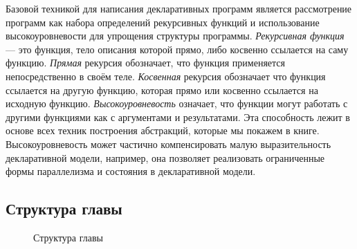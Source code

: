 Базовой техникой для написания декларативных программ является рассмотрение программ как набора определений рекурсивных функций и использование высокоуровневости для упрощения структуры программы. \emph{Рекурсивная функция} --- это функция, тело описания которой прямо, либо косвенно ссылается на саму функцию. \emph{Прямая} рекурсия обозначает, что функция применяется непосредственно в своём теле. \emph{Косвенная} рекурсия обозначает что функция ссылается на другую функцию, которая прямо или косвенно ссылается на исходную функцию. \emph{Высокоуровневость} означает, что функции могут работать с другими функциями как с аргументами и результатами. Эта способность лежит в основе всех техник построения абстракций, которые мы покажем в книге. Высокоуровневость может частично компенсировать малую выразительность декларативной модели, например, она позволяет реализовать ограниченные формы параллелизма и состояния в декларативной модели.

\subsection*{Структура главы}

\begin{figure}
  \caption{Структура главы}
  \label{figure:Chapter_structure}
\end{figure}

